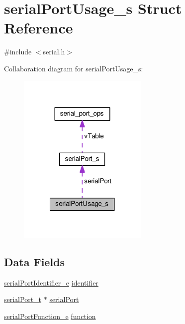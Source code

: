 \hypertarget{structserialPortUsage__s}{\section{serial\+Port\+Usage\+\_\+s Struct Reference}
\label{structserialPortUsage__s}
}


{\ttfamily \#include $<$serial.\+h$>$}



Collaboration diagram for serial\+Port\+Usage\+\_\+s\+:\nopagebreak
\begin{figure}[H]
\begin{center}
\leavevmode
\includegraphics[width=176pt]{structserialPortUsage__s__coll__graph}
\end{center}
\end{figure}
\subsection*{Data Fields}
\begin{DoxyCompactItemize}
\item 
\hyperlink{config_2serial_8h_a5aaf3d2a774f7a0335773299b8d78182}{serial\+Port\+Identifier\+\_\+e} \hyperlink{structserialPortUsage__s_a3694c35349d1453f0b6949d2dc9a31d0}{identifier}
\item 
\hyperlink{drivers_2serial_8h_a64a5e2f04e1a908fbb1b3b165f88e0ef}{serial\+Port\+\_\+t} $\ast$ \hyperlink{structserialPortUsage__s_af40a0fbe2c079e2e30d9bffb8f410c65}{serial\+Port}
\item 
\hyperlink{config_2serial_8h_a8ba154b06bfcc6ed804f92dd0b50a53a}{serial\+Port\+Function\+\_\+e} \hyperlink{structserialPortUsage__s_a782ced3de11e11bc132cf01f3d490d68}{function}
\end{DoxyCompactItemize}


